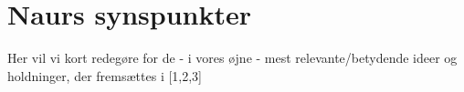 \section{Naurs synspunkter}
Her vil vi kort redegøre for de - i vores øjne - mest relevante/betydende
ideer og holdninger, der fremsættes i [1,2,3]

\subsection{}

